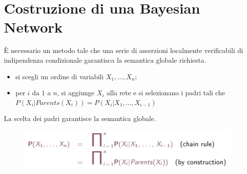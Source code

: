\documentclass[a4paper, notitlepage, 9pt]{extreport}
\begin{document}
\section*{Costruzione di una Bayesian Network}
È necessario un metodo tale che una serie di asserzioni localmente verificabili di indipendenza condizionale garantisca la semantica globale richiesta.
\begin{multicols}{2}
	\begin{itemize}
		\item si scegli un ordine di variabili $X_1, \dots, X_n$;
		\item per $i$ da $1$ a $n$, si aggiunge $X_i$ alla rete e si selezionano i padri tali che\\
		$P(X_i | Parents(X_i)) = P(X_i | X_1, \dots, X_{i-1})$
	\end{itemize}
	La scelta dei padri garantisce la semantica globale.
	\columnbreak
	\begin{figure}[H]
		\centering
		\includegraphics[scale=0.42]{BN3}
	\end{figure}
\end{multicols}
\end{document}
